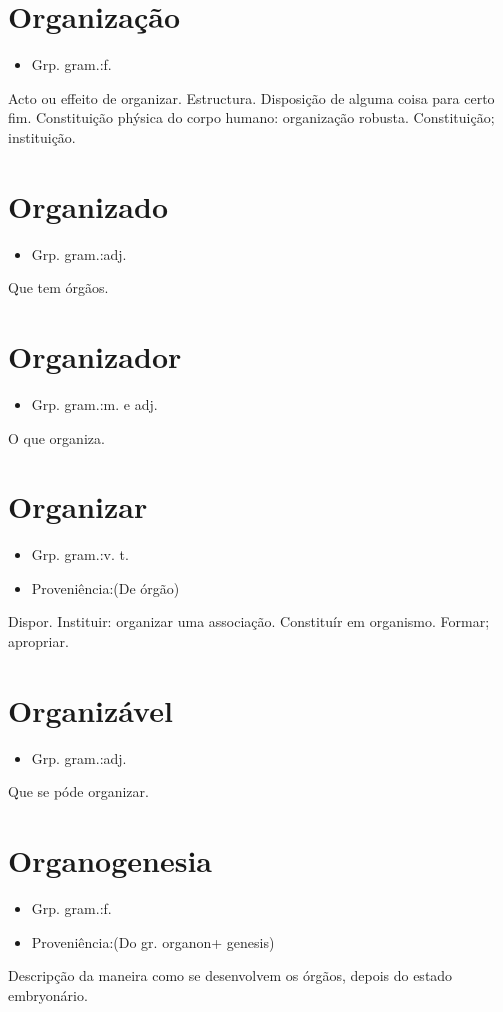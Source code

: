 \section{Organização}
\begin{itemize}
\item {Grp. gram.:f.}
\end{itemize}
Acto ou effeito de organizar.
Estructura.
Disposição de alguma coisa para certo fim.
Constituição phýsica do corpo humano: \textunderscore organização robusta\textunderscore .
Constituição; instituição.
\section{Organizado}
\begin{itemize}
\item {Grp. gram.:adj.}
\end{itemize}
Que tem órgãos.
\section{Organizador}
\begin{itemize}
\item {Grp. gram.:m.  e  adj.}
\end{itemize}
O que organiza.
\section{Organizar}
\begin{itemize}
\item {Grp. gram.:v. t.}
\end{itemize}
\begin{itemize}
\item {Proveniência:(De \textunderscore órgão\textunderscore )}
\end{itemize}
Dispor.
Instituir: \textunderscore organizar uma associação\textunderscore .
Constituír em organismo.
Formar; apropriar.
\section{Organizável}
\begin{itemize}
\item {Grp. gram.:adj.}
\end{itemize}
Que se póde organizar.
\section{Organogenesia}
\begin{itemize}
\item {Grp. gram.:f.}
\end{itemize}
\begin{itemize}
\item {Proveniência:(Do gr. \textunderscore organon\textunderscore  + \textunderscore genesis\textunderscore )}
\end{itemize}
Descripção da maneira como se desenvolvem os órgãos, depois do estado embryonário.
